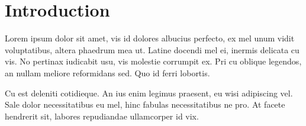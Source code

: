 
\section{Introduction}

Lorem ipsum dolor sit amet, vis id dolores albucius perfecto, ex mel unum vidit voluptatibus, altera phaedrum mea ut.
Latine docendi mel ei, inermis delicata cu vis.
No pertinax iudicabit usu, vis molestie corrumpit ex.
Pri cu oblique legendos, an nullam meliore reformidans sed.
Quo id ferri lobortis.

Cu est deleniti cotidieque.
An ius enim legimus praesent, eu wisi adipiscing vel.
Sale dolor necessitatibus eu mel, hinc fabulas necessitatibus ne pro.
At facete hendrerit sit, labores repudiandae ullamcorper id vix.
